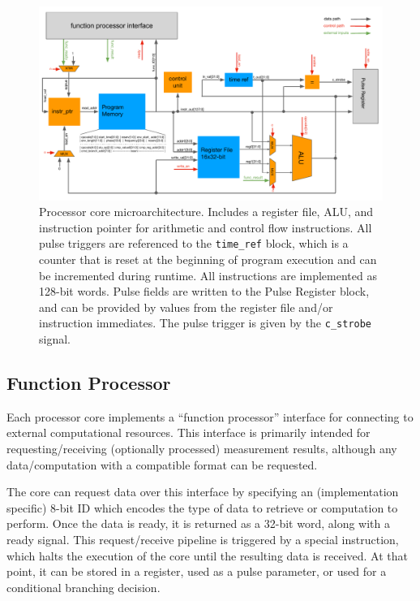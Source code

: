 \documentclass[journal]{IEEEtran}
\begin{document}
\begin{figure}
    \centering
    \includegraphics[scale=0.65, trim={0 10 0 0}, clip]{figures/microarch_diagram.pdf}
    \caption{Processor core microarchitecture. Includes a register file, ALU, and instruction pointer for arithmetic and control flow instructions. All pulse triggers are referenced to the \texttt{time\_ref} block, which is a counter that is reset at the beginning of program execution and can be incremented during runtime. All instructions are implemented as 128-bit words. Pulse fields are written to the Pulse Register block, and can be provided by values from the register file and/or instruction immediates. The pulse trigger is given by the \texttt{c\_strobe} signal.}
    \label{fig:microarch_diagram}
\end{figure}

\subsection{Function Processor}

Each processor core implements a ``function processor'' interface for connecting to external computational resources. This interface is primarily intended for requesting/receiving (optionally processed) measurement results, although any data/computation with a compatible format can be requested.

The core can request data over this interface by specifying an (implementation specific) 8-bit ID which encodes the type of data to retrieve or computation to perform. Once the data is ready, it is returned as a 32-bit word, along with a ready signal. This request/receive pipeline is triggered by a special instruction, which halts the execution of the core until the resulting data is received. At that point, it can be stored in a register, used as a pulse parameter, or used for a conditional branching decision.
\end{document}
